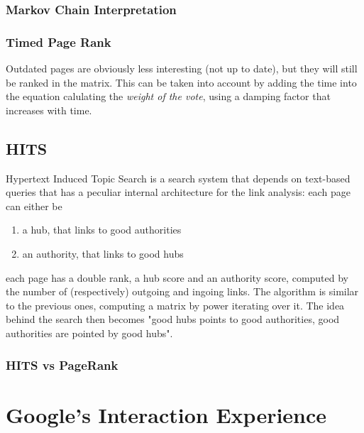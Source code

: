 \documentclass{article}
\begin{document}
			\subsubsection{Markov Chain Interpretation} %

			\subsubsection{Timed Page Rank}
				Outdated pages are obviously less interesting (not up to date), but they will still be ranked in the matrix. This can be taken into account by adding the time into the equation calulating the \textit{weight of the vote}, using a damping factor that increases with time.

		\subsection{HITS}
			Hypertext Induced Topic Search is a search system that depends on text-based queries that has a peculiar internal architecture for the link analysis: each page can either be
			\begin{enumerate}
				\item a hub, that links to good authorities
				\item an authority, that links to good hubs
			\end{enumerate}
			each page has a double rank, a hub score and an authority score, computed by the number of (respectively) outgoing and ingoing links. The algorithm is similar to the previous ones, computing a matrix by power iterating over it. The idea behind the search then becomes "good hubs points to good authorities, good authorities are pointed by good hubs".
		
			\subsubsection{HITS vs PageRank} %

	\section{Google's Interaction Experience}
\end{document}
